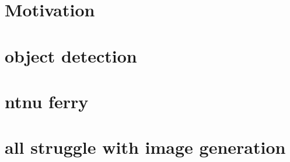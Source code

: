 
\section{Motivation}


\section{object detection}

\section{ntnu ferry}

\section{all struggle with image generation}